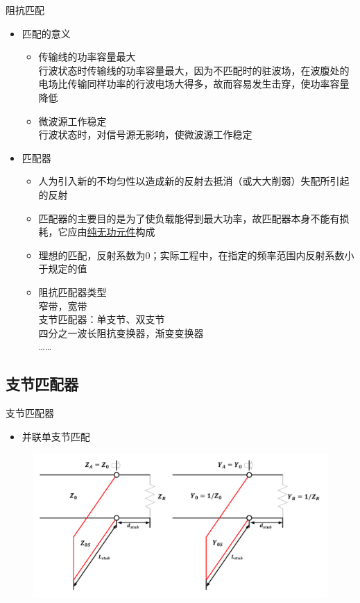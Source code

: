 \begin{frame}{阻抗匹配}
  \begin{itemize}
    \item 匹配的意义
          \begin{itemize}
            \item 传输线的功率容量最大\\
                  行波状态时传输线的功率容量最大，因为不匹配时的驻波场，在波腹处的电场比传输同样功率的行波电场大得多，故而容易发生击穿，使功率容量降低
            \item 微波源工作稳定\\
                  行波状态时，对信号源无影响，使微波源工作稳定
          \end{itemize}
    \item 匹配器
          \begin{itemize}
            \item 人为引入新的不均匀性以造成新的反射去抵消（或大大削弱）失配所引起的反射
            \item 匹配器的主要目的是为了使负载能得到最大功率，故匹配器本身不能有损耗，它应由\uline{纯无功元件}构成
            \item 理想的匹配，反射系数为0；实际工程中，在指定的频率范围内反射系数小于规定的值
            \item 阻抗匹配器类型 \\
                  窄带，宽带\\
                  支节匹配器：单支节、双支节\\
                  四分之一波长阻抗变换器，渐变变换器\\
                  ……
          \end{itemize}
  \end{itemize}
\end{frame}

\subsection{支节匹配器}
\begin{frame}{支节匹配器}
  \begin{itemize}
    \item 并联单支节匹配
  \end{itemize}
  \centering
  \begin{figure}
    \includegraphics[width=12cm]{fig4-23.pdf}
  \end{figure}
\end{frame}

